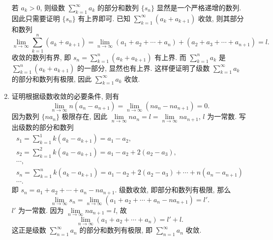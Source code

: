 \documentclass[a4paper, 11pt]{ctexart}
\begin{document}
\begin{enumerate}
        若 $a_k > 0$, 则级数 $\sum\limits_{k=1}^\infty a_k$ 的部分和数列 $\{s_n\}$ 显然是一个严格递增的数列.
        因此只需要证明 $\{s_n\}$ 有上界即可. 已知 $\sum\limits_{k=1}^\infty (a_k + a_{k+1})$ 收敛, 则其部分和数列
        \[
            \lim_{n\to\infty}\sum_{k=1}^n (a_k + a_{k+1}) = \lim_{n\to\infty} (a_1 + a_2 + \cdots + a_n) + (a_2 + a_3 + \cdots + a_{n+1}) = l.    
        \]
        收敛的数列有界, 即 $s_n = \sum\limits_{k=1}^n (a_k + a_{k+1})$ 有上界.
        而 $\sum\limits_{k=1}^n a_k$ 是 $\sum\limits_{k=1}^n (a_k + a_{k+1})$ 的一部分, 显然也有上界.
        这样便证明了级数 $\sum\limits_{k=1}^\infty a_k$ 的部分和数列有极限, 因此 $\sum\limits_{k=1}^\infty a_k$ 收敛.
    \item %
        {\heiti 证明}\quad 根据级数收敛的必要条件, 则有
        \[
            \lim_{n\to\infty}n(a_n - a_{n+1}) = \lim_{n\to\infty}(na_n - na_{n+1}) = 0.
        \]
        因为数列 $\{na_n\}$ 极限存在, 因此 $\lim\limits_{n\to\infty}na_n = l = \lim\limits_{n\to\infty}na_{n+1}$, $l$ 为一常数.
        写出级数的部分和数列
        \begin{gather*}
            s_1 = \sum_{k=1}^1 k(a_k - a_{k+1}) = a_1 - a_2, \\
            s_2 = \sum_{k=1}^2 k(a_k - a_{k+1}) = a_1 - a_2 + 2(a_2 - a_3), \\
            \cdots, \\
            s_n = \sum_{k=1}^n k(a_k - a_{k+1}) = a_1 - a_2 + 2(a_2 - a_3) + \cdots + n(a_n - a_{n+1}) \\
            \cdots.
        \end{gather*}
        即 $s_n = a_1 + a_2 + \cdots + a_n - na_{n+1}$. 级数收敛, 即部分和数列有极限, 那么
        \[
            \lim_{n\to\infty}s_n = \lim_{n\to\infty} (a_1 + a_2 + \cdots + a_n - na_{n+1}) = l'.    
        \]
        $l'$ 为一常数. 因为 $\lim\limits_{n\to\infty}na_{n+1} = l$, 故
        \[
            \lim_{n\to\infty} (a_1 + a_2 + \cdots + a_n) = l' + l.    
        \]
        这正是级数 $\sum\limits_{n=1}^\infty a_n$ 的部分和数列有极限, 即 $\sum\limits_{n=1}^\infty a_n$ 收敛.
\end{enumerate}
\end{document}
